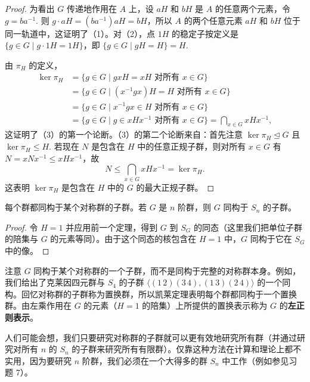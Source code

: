 \begin{proof}
为看出 \(G\) 传递地作用在 \(A\) 上，设 \(aH\) 和 \(bH\) 是 \(A\) 的任意两个元素，令 \(g = ba^{-1}\). 则 \(g \cdot aH = (ba^{-1})aH = bH\)，所以 \(A\) 的两个任意元素 \(aH\) 和 \(bH\) 位于同一轨道中，这证明了（1）。对（2），点 \(1H\) 的稳定子按定义是 \(\{g \in G \mid g \cdot 1H = 1H\}\)，即 \(\{g \in G \mid gH = H\} = H\).

由 \(\pi_H\) 的定义，
\[
\begin{aligned}
\ker \pi_H &= \{g \in G \mid g xH = xH \text{ 对所有 } x \in G\} \\
&= \{g \in G \mid (x^{-1}gx)H = H \text{ 对所有 } x \in G\} \\
&= \{g \in G \mid x^{-1}gx \in H \text{ 对所有 } x \in G\} \\
&= \{g \in G \mid g \in xHx^{-1} \text{ 对所有 } x \in G\} = \bigcap_{x \in G} xHx^{-1},
\end{aligned}
\]
这证明了（3）的第一个论断。（3）的第二个论断来自：首先注意 \(\ker \pi_H \trianglelefteq G\) 且 \(\ker \pi_H \leq H\). 若现在 \(N\) 是包含在 \(H\) 中的任意正规子群，则对所有 \(x \in G\) 有 \(N = xNx^{-1} \leq xHx^{-1}\)，故
\[
N \leq \bigcap_{x \in G} xHx^{-1} = \ker \pi_H.
\]
这表明 \(\ker \pi_H\) 是包含在 \(H\) 中的 \(G\) 的最大正规子群。
\end{proof}

\begin{corollary}[凯莱定理]\label{cor:4.4}
每个群都同构于某个对称群的子群。若 \(G\) 是 \(n\) 阶群，则 \(G\) 同构于 \(S_n\) 的子群。
\end{corollary}

\begin{proof}
令 \(H = 1\) 并应用前一个定理，得到 \(G\) 到 \(S_G\) 的同态（这里我们把单位子群的陪集与 \(G\) 的元素等同）。由于这个同态的核包含在 \(H = 1\) 中，\(G\) 同构于它在 \(S_G\) 中的像。
\end{proof}

注意 \(G\) 同构于某个对称群的一个子群，而不是同构于完整的对称群本身。例如，我们给出了克莱因四元群与 \(S_4\) 的子群 \(\langle (1\,2)(3\,4), (1\,3)(2\,4) \rangle\) 的一个同构。回忆对称群的子群称为置换群，所以凯莱定理表明每个群都同构于一个置换群。由左乘作用在 \(G\) 的元素（\(H = 1\) 的陪集）上所提供的置换表示称为 \(G\) 的\textbf{左正则表示}。

人们可能会想，我们只要研究对称群的子群就可以更有效地研究所有群（并通过研究对所有 \(n\) 的 \(S_n\) 的子群来研究所有有限群）。仅靠这种方法在计算和理论上都不实用，因为要研究 \(n\) 阶群，我们必须在一个大得多的群 \(S_n\) 中工作（例如参见习题 7）。

